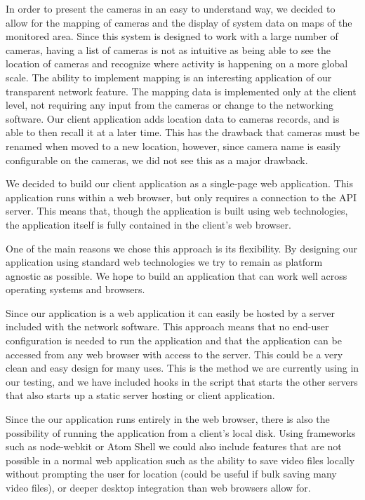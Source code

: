 In order to present the cameras in an easy to understand way, we decided to
allow for the mapping of cameras and the display of system data on maps of the
monitored area. Since this system is designed to work with a large number of
cameras, having a list of cameras is not as intuitive as being able to see the
location of cameras and recognize where activity is happening on a more global
scale. The ability to implement mapping is an interesting application of our
transparent network feature. The mapping data is implemented only at the client
level, not requiring any input from the cameras or change to the networking
software. Our client application adds location data to cameras records, and is
able to then recall it at a later time.  This has the drawback that cameras must
be renamed when moved to a new location, however, since camera name is easily
configurable on the cameras, we did not see this as a major drawback.

We decided to build our client application as a single-page web application.
This application runs within a web browser, but only requires a connection to
the API server. This means that, though the application is built using web
technologies, the application itself is fully contained in the client's web
browser.

One of the main reasons we chose this approach is its flexibility. By designing
our application using standard web technologies we try to remain as platform
agnostic as possible. We hope to build an application that can work well across
operating systems and browsers.

Since our application is a web application it can easily be hosted by a server
included with the network software. This approach means that no end-user
configuration is needed to run the application and that the application can be
accessed from any web browser with access to the server. This could be a very
clean and easy design for many uses. This is the method we are currently using
in our testing, and we have included hooks in the script that starts the other
servers that also starts up a static server hosting or client application.

Since the our application runs entirely in the web browser, there is also the
possibility of running the application from a client's local disk. Using
frameworks such as node-webkit\cite{nw_home} or Atom Shell\cite{atom_home} we
could also include features that are not possible in a normal web application
such as the ability to save video files locally without prompting the user for
location (could be useful if bulk saving many video files), or deeper desktop
integration than web browsers allow for.

